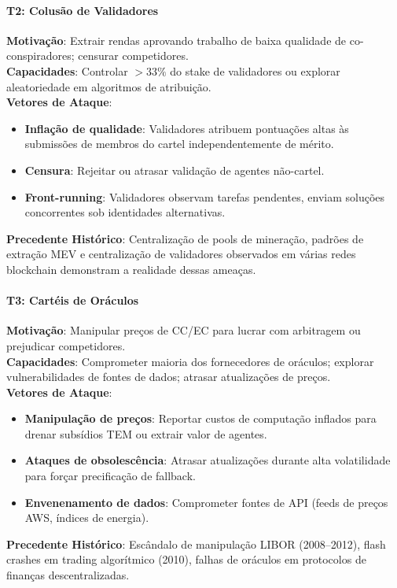 \documentclass[11pt]{article}
\begin{document}
\begin{itemize}[noitemsep]
\begin{itemize}[noitemsep]
\begin{itemize}[noitemsep]
\paragraph{T2: Colusão de Validadores}
\textbf{Motivação}: Extrair rendas aprovando trabalho de baixa qualidade de co-conspiradores; censurar competidores.\\
\textbf{Capacidades}: Controlar $>33\%$ do stake de validadores ou explorar aleatoriedade em algoritmos de atribuição.\\
\textbf{Vetores de Ataque}:
\begin{itemize}[noitemsep]
  \item \textbf{Inflação de qualidade}: Validadores atribuem pontuações altas às submissões de membros do cartel independentemente de mérito.
  \item \textbf{Censura}: Rejeitar ou atrasar validação de agentes não-cartel.
  \item \textbf{Front-running}: Validadores observam tarefas pendentes, enviam soluções concorrentes sob identidades alternativas.
\end{itemize}
\textbf{Precedente Histórico}: Centralização de pools de mineração, padrões de extração MEV e centralização de validadores observados em várias redes blockchain demonstram a realidade dessas ameaças.

\paragraph{T3: Cartéis de Oráculos}
\textbf{Motivação}: Manipular preços de CC/EC para lucrar com arbitragem ou prejudicar competidores.\\
\textbf{Capacidades}: Comprometer maioria dos fornecedores de oráculos; explorar vulnerabilidades de fontes de dados; atrasar atualizações de preços.\\
\textbf{Vetores de Ataque}:
\begin{itemize}[noitemsep]
  \item \textbf{Manipulação de preços}: Reportar custos de computação inflados para drenar subsídios TEM ou extrair valor de agentes.
  \item \textbf{Ataques de obsolescência}: Atrasar atualizações durante alta volatilidade para forçar precificação de fallback.
  \item \textbf{Envenenamento de dados}: Comprometer fontes de API (feeds de preços AWS, índices de energia).
\end{itemize}
\textbf{Precedente Histórico}: Escândalo de manipulação LIBOR (2008--2012), flash crashes em trading algorítmico (2010), falhas de oráculos em protocolos de finanças descentralizadas.


\end{itemize}
\end{itemize}
\end{itemize}
\end{document}
